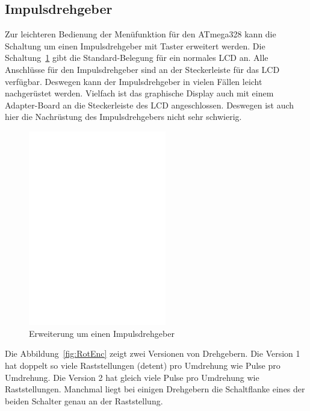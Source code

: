 \subsection{Impulsdrehgeber}

Zur leichteren Bedienung der Menüfunktion für den ATmega328 kann die Schaltung um einen
Impulsdrehgeber mit Taster erweitert werden. Die Schaltung~\ref{fig:RotExt} gibt die Standard-Belegung
für ein normales LCD an. Alle Anschlüsse für den Impulsdrehgeber sind an der Steckerleiste für das LCD 
verfügbar. 
Deswegen kann der Impulsdrehgeber in vielen Fällen leicht nachgerüstet werden. 
Vielfach ist das graphische Display auch mit einem Adapter-Board an die Steckerleiste des LCD angeschlossen. 
Deswegen ist auch hier die Nachrüstung des Impulsdrehgebers nicht sehr schwierig.

\begin{figure}[H]
\centering
\includegraphics[width=6cm]{../FIG/rotary_extension.eps}
\caption{Erweiterung um einen Impulsdrehgeber}
\label{fig:RotExt}
\end{figure}

Die Abbildung~\ref{fig:RotEnc} zeigt zwei Versionen von Drehgebern.
Die Version 1 hat doppelt so viele Raststellungen (detent) pro Umdrehung
wie Pulse pro Umdrehung.
Die Version 2 hat gleich viele Pulse pro Umdrehung wie Raststellungen.
Manchmal liegt bei einigen Drehgebern die Schaltflanke eines der beiden Schalter genau an der
Raststellung.

